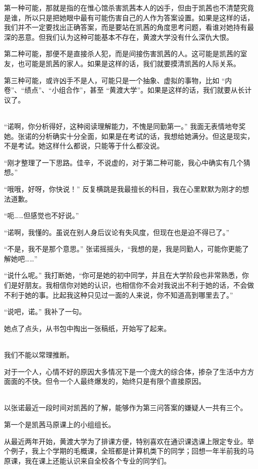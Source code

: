 \documentclass[UTF8]{ctexart}
\begin{document}
第一种可能，那就是指的在惟心馆杀害凯茜本人的凶手，但由于凯茜也不清楚究竟是谁，所以只是把她眼中最有可能伤害自己的人作为答案设置。如果是这样的话，我们并不一定要找出正确答案，而是要站在凯茜的角度思考问题，看谁对她持有最深的恶意。但我们认为这种可能基本不存在，黄渡大学没有什么深仇大恨。

第二种可能，那便不是直接杀人犯，而是间接伤害凯茜的人。这可能是凯茜的室友，也可能是凯茜的家人。如果是这样的话，我们就要摸清凯茜的人际关系。

第三种可能，或许凶手不是人，可能只是一个抽象、虚拟的事物，比如 “内卷”、“绩点”、“小组合作”，甚至 “黄渡大学”。如果是这样的话，我们就要从长计议了。

~\\

“诺啊，你分析得好，这种阅读理解能力，不愧是同勤第一。” 我面无表情地夸奖她。张诺的分析确实十分全面，如果是在考试的话，我想给她满分。但这是现实，不是考试。她这样什么都说，只能等于什么都没说。

“刚才整理了一下思路。佳辛，不说虚的，对于第二种可能，我心中确实有几个猜想。”

“哦哦，好呀，你快说！” 反复横跳是我最擅长的科目，我在心里默默为刚才的想法道歉。

“呃……但感觉也不好说。”

“诺啊，我懂的。虽说在别人身后议论有失风度，但现在也是迫不得已了。”

“不是，我不是那个意思。” 张诺摇摇头，“我想的是，我是同勤人，可能你更能了解她吧……”

“说什么呢。” 我打断她，“你可是她的初中同学，并且在大学阶段也非常熟悉，你们是好朋友。我相信你对她的认识，也相信你不会对我说出不利于她的话，不会做不利于她的事。比起我这种只见过一面的人来说，你不知道高到哪里去了。”

“说吧，诺。” 我补了一句。

她点了点头，从书包中掏出一张稿纸，开始写了起来。

~\\

我们不能以常理推断。

对于一个人，心情不好的原因大多情况下是一个庞大的综合体，掺杂了生活中方方面面的不快。但令一个人最终爆发的，始终只是有限个直接原因。

~\\

以张诺最近一段时间对凯茜的了解，能够作为第三问答案的嫌疑人一共有三个。

第一个是凯茜马原课上的小组组长。

从最近两年开始，黄渡大学为了排课方便，特别喜欢在通识课选课上限定专业。举个例子，我上个学期的毛概课，全班都是计算机类下的同学；回想一年半前我的马原课，我在课上还能认识来自全校各个专业的同学们。
\end{document}
